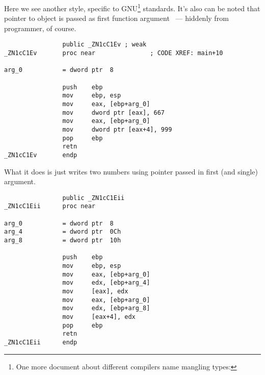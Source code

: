 {Here we see another  style, specific to GNU\footnote{One more document about different compilers name mangling types: \URLAGNER} standards. It's also can be noted that pointer to object is passed as first function argument ~--- hiddenly from programmer, of course.}


\begin{lstlisting}
                public _ZN1cC1Ev ; weak
_ZN1cC1Ev       proc near               ; CODE XREF: main+10

arg_0           = dword ptr  8

                push    ebp
                mov     ebp, esp
                mov     eax, [ebp+arg_0]
                mov     dword ptr [eax], 667
                mov     eax, [ebp+arg_0]
                mov     dword ptr [eax+4], 999
                pop     ebp
                retn
_ZN1cC1Ev       endp
\end{lstlisting}

{What it does is just writes two numbers using pointer passed in first (and single) argument.}


\begin{lstlisting}
                public _ZN1cC1Eii
_ZN1cC1Eii      proc near

arg_0           = dword ptr  8
arg_4           = dword ptr  0Ch
arg_8           = dword ptr  10h

                push    ebp
                mov     ebp, esp
                mov     eax, [ebp+arg_0]
                mov     edx, [ebp+arg_4]
                mov     [eax], edx
                mov     eax, [ebp+arg_0]
                mov     edx, [ebp+arg_8]
                mov     [eax+4], edx
                pop     ebp
                retn
_ZN1cC1Eii      endp
\end{lstlisting}



